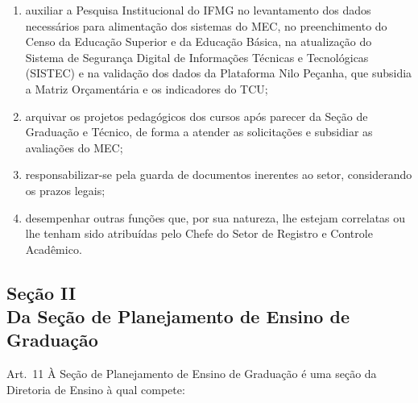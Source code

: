 \documentclass[a4paper,12pt]{report}
\begin{document}
\begin{enumerate}
\item auxiliar a Pesquisa Institucional do IFMG no levantamento dos dados necessários para 
      alimentação dos sistemas do MEC, no preenchimento do Censo da Educação Superior e da Educação Básica, na atualização do Sistema de Segurança Digital de Informações Técnicas e Tecnológicas (SISTEC) e na validação dos dados da Plataforma Nilo Peçanha, que subsidia a Matriz Orçamentária e os indicadores do TCU;

\item arquivar os projetos pedagógicos dos cursos após parecer da Seção de Graduação e 
      Técnico, de forma a atender as solicitações e subsidiar as avaliações do MEC;

\item responsabilizar-se pela guarda de documentos inerentes ao setor, considerando os 
      prazos legais;

\item desempenhar outras funções que, por sua natureza, lhe estejam correlatas ou lhe 
      tenham sido atribuídas pelo Chefe do Setor de Registro e Controle Acadêmico.

\end{enumerate}


\subsection{Seção II \\ Da Seção de Planejamento de Ensino de Graduação}

Art.~11 À Seção de Planejamento de Ensino de Graduação é uma seção da Diretoria de Ensino à qual compete:
\end{document}
